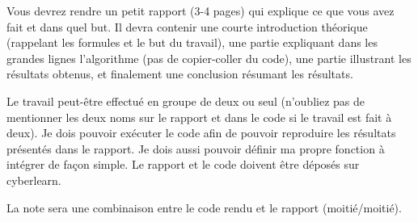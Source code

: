 \documentclass[a4paper,10pt]{article}
\begin{document}
Vous devrez rendre un petit rapport (3-4 pages) qui explique ce que vous avez fait et dans quel but. Il devra contenir
une courte introduction théorique (rappelant les formules et le but du travail), une partie expliquant dans les grandes lignes 
l'algorithme (pas de copier-coller du code), une partie illustrant les résultats obtenus, et finalement
une conclusion résumant les résultats.

Le travail peut-être effectué en groupe de deux ou seul
(n'oubliez pas de mentionner les deux noms sur le rapport et dans le code si le travail est fait à deux). 
Je dois pouvoir exécuter le code
afin de pouvoir reproduire les résultats présentés dans le rapport. Je dois aussi pouvoir 
définir ma propre fonction à intégrer de façon simple.
Le rapport et le code doivent être déposés sur cyberlearn.

La note sera une combinaison entre le code rendu et le rapport (moitié/moitié). 
\end{document}
